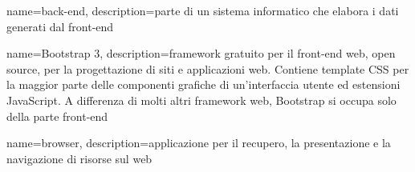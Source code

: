\hypertarget{B}{}

{
	name=back-end,
	description={parte di un sistema informatico che elabora i dati generati dal front-end}
}

{
	name=Bootstrap 3,
	description={framework gratuito per il front-end web, open source, per la progettazione di siti e applicazioni web. Contiene template CSS per la maggior parte delle componenti grafiche di un'interfaccia utente ed estensioni JavaScript. A differenza di molti altri framework web, Bootstrap si occupa solo della parte front-end}
}

{
	name=browser,
	description={applicazione per il recupero, la presentazione e la navigazione di risorse sul web}
}